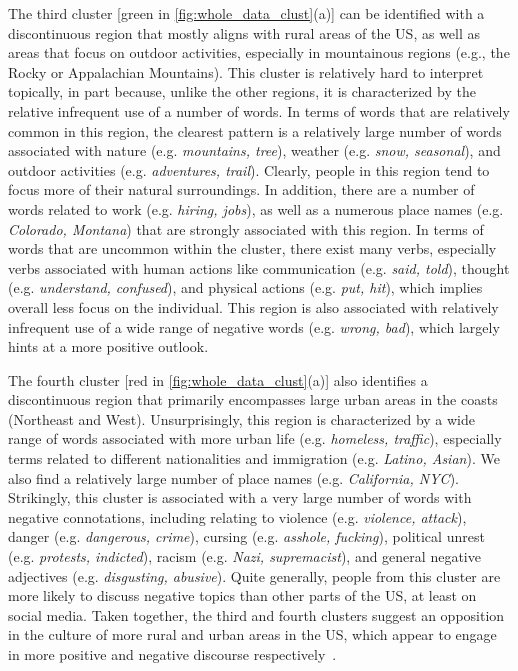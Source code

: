 \documentclass[../thesis.tex]{subfiles}
\begin{document}
The third cluster [green in \cref{fig:whole_data_clust}(a)] can be identified with a
discontinuous region that mostly aligns with rural areas of the US, as well as areas
that focus on outdoor activities, especially in mountainous regions (e.g., the Rocky or
Appalachian Mountains). This cluster is relatively hard to interpret topically, in part
because, unlike the other regions, it is characterized by the relative infrequent use of
a number of words. In terms of words that are relatively common in this region, the
clearest pattern is a relatively large number of words associated with nature (e.g.
\textit{mountains, tree}), weather (e.g. \textit{snow, seasonal}), and outdoor
activities (e.g. \textit{adventures, trail}). Clearly, people in this region tend to
focus more of their natural surroundings. In addition, there are a number of words
related to work (e.g. \textit{hiring, jobs}), as well as a numerous place names (e.g.
\textit{Colorado, Montana}) that are strongly associated with this region. In terms of
words that are uncommon within the cluster, there exist many verbs, especially verbs
associated with human actions like communication (e.g. \textit{said, told}), thought
(e.g. \textit{understand, confused}), and physical actions (e.g. \textit{put, hit}),
which implies overall less focus on the individual. This region is also associated with
relatively infrequent use of a wide range of negative words (e.g. \textit{wrong, bad}),
which largely hints at a more positive outlook.  

The fourth cluster [red in \cref{fig:whole_data_clust}(a)] also identifies a
discontinuous region that primarily encompasses large urban areas in the coasts
(Northeast and West). Unsurprisingly, this region is characterized by a wide range of
words associated with more urban life (e.g. \textit{homeless, traffic}), especially
terms related to different nationalities and immigration (e.g. \textit{Latino, Asian}).
We also find a relatively large number of place names (e.g. \textit{California, NYC}).
Strikingly, this cluster is associated with a very large number of words with negative
connotations, including relating to violence (e.g. \textit{violence, attack}), danger
(e.g. \textit{dangerous, crime}), cursing (e.g. \textit{asshole, fucking}), political
unrest (e.g. \textit{protests, indicted}), racism (e.g. \textit{Nazi, supremacist}), and
general negative adjectives (e.g. \textit{disgusting, abusive}). Quite generally, people
from this cluster are more likely to discuss negative topics than other parts of the US,
at least on social media. Taken together, the third and fourth clusters suggest an
opposition in the culture of more rural and urban areas in the US, which appear to
engage in more positive and negative discourse respectively~\cite{vanderbeck2003young}. 
\end{document}
